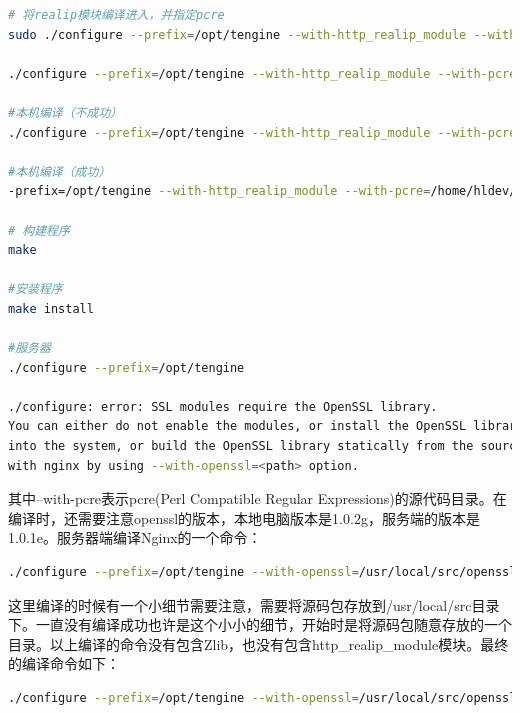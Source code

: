 \documentclass[11pt,fleqn]{book}
\numberwithin{dummy}{section}
\theoremstyle{ocrenumbox}
\theoremstyle{blacknumex}
\theoremstyle{blacknumbox}
\theoremstyle{ocrenum}
\begin{document}
\begin{lstlisting}[language=bash]
# 将realip模块编译进入，并指定pcre
sudo ./configure --prefix=/opt/tengine --with-http_realip_module --with-pcre=/root/software/pcre-8.40 --with-openssl=/root/software/openssl-OpenSSL_1_1_0e --without-http_gzip_module

./configure --prefix=/opt/tengine --with-http_realip_module --with-pcre=/root/software/pcre-8.40  --without-http_gzip_module

#本机编译（不成功）
./configure --prefix=/opt/tengine --with-http_realip_module --with-pcre=/home/hldev/Downloads/pcre-8.40 --with-openssl=/home/hldev/Downloads/openssl-OpenSSL_1_0_1e --without-http_gzip_module

#本机编译（成功）
-prefix=/opt/tengine --with-http_realip_module --with-pcre=/home/hldev/Downloads/pcre-8.40 --with-openssl=/home/hldev/software/openssl-OpenSSL_1_0_2g --without-http_gzip_module

# 构建程序
make

#安装程序
make install

#服务器
./configure --prefix=/opt/tengine

./configure: error: SSL modules require the OpenSSL library.
You can either do not enable the modules, or install the OpenSSL library
into the system, or build the OpenSSL library statically from the source
with nginx by using --with-openssl=<path> option.


\end{lstlisting}

其中--with-pcre表示pcre(Perl Compatible Regular Expressions)的源代码目录。在编译时，还需要注意openssl的版本，本地电脑版本是1.0.2g，服务端的版本是1.0.1e。服务器端编译Nginx的一个命令：

\begin{lstlisting}[language=bash]
./configure --prefix=/opt/tengine --with-openssl=/usr/local/src/openssl-OpenSSL_1_0_2g/ --without-http_gzip_module --with-pcre=/usr/local/src/pcre-8.40/
\end{lstlisting}

这里编译的时候有一个小细节需要注意，需要将源码包存放到/usr/local/src目录下。一直没有编译成功也许是这个小小的细节，开始时是将源码包随意存放的一个目录。以上编译的命令没有包含Zlib，也没有包含http\_realip\_module模块。最终的编译命令如下：

\begin{lstlisting}[language=bash]
./configure --prefix=/opt/tengine --with-openssl=/usr/local/src/openssl-OpenSSL_1_0_2g/ --with-pcre=/usr/local/src/pcre-8.40/ --with-zlib=/usr/local/src/zlib-1.2.11 --with-http_realip_module 
\end{lstlisting}
\end{document}
